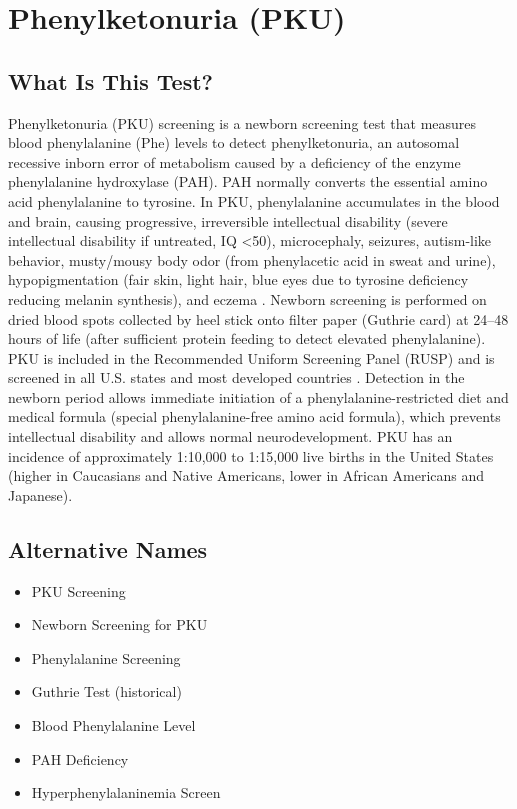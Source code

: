 \chapter{Phenylketonuria (PKU)}

\section*{What Is This Test?}
Phenylketonuria (PKU) screening is a newborn screening test that measures blood phenylalanine (Phe) levels to detect phenylketonuria, an autosomal recessive inborn error of metabolism caused by a deficiency of the enzyme phenylalanine hydroxylase (PAH). PAH normally converts the essential amino acid phenylalanine to tyrosine. In PKU, phenylalanine accumulates in the blood and brain, causing progressive, irreversible intellectual disability (severe intellectual disability if untreated, IQ <50), microcephaly, seizures, autism-like behavior, musty/mousy body odor (from phenylacetic acid in sweat and urine), hypopigmentation (fair skin, light hair, blue eyes due to tyrosine deficiency reducing melanin synthesis), and eczema \cite{scriver2001metabolic}. Newborn screening is performed on dried blood spots collected by heel stick onto filter paper (Guthrie card) at 24--48 hours of life (after sufficient protein feeding to detect elevated phenylalanine). PKU is included in the Recommended Uniform Screening Panel (RUSP) and is screened in all U.S. states and most developed countries \cite{acmg2012newborn}. Detection in the newborn period allows immediate initiation of a phenylalanine-restricted diet and medical formula (special phenylalanine-free amino acid formula), which prevents intellectual disability and allows normal neurodevelopment. PKU has an incidence of approximately 1:10,000 to 1:15,000 live births in the United States (higher in Caucasians and Native Americans, lower in African Americans and Japanese).

\section*{Alternative Names}
\begin{itemize}
  \item PKU Screening
  \item Newborn Screening for PKU
  \item Phenylalanine Screening
  \item Guthrie Test (historical)
  \item Blood Phenylalanine Level
  \item PAH Deficiency
  \item Hyperphenylalaninemia Screen
\end{itemize}
